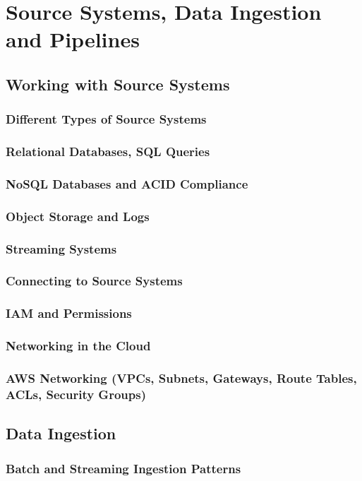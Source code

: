 \section{Source Systems, Data Ingestion and Pipelines}
\subsection{Working with Source Systems}
\subsubsection{Different Types of Source Systems}
\subsubsection{Relational Databases, SQL Queries}
\subsubsection{NoSQL Databases and ACID Compliance}
\subsubsection{Object Storage and Logs}
\subsubsection{Streaming Systems}
\subsubsection{Connecting to Source Systems}
\subsubsection{IAM and Permissions}
\subsubsection{Networking in the Cloud}
\subsubsection{AWS Networking (VPCs, Subnets, Gateways, Route Tables, ACLs, Security Groups)}

\subsection{Data Ingestion}
\subsubsection{Batch and Streaming Ingestion Patterns}

